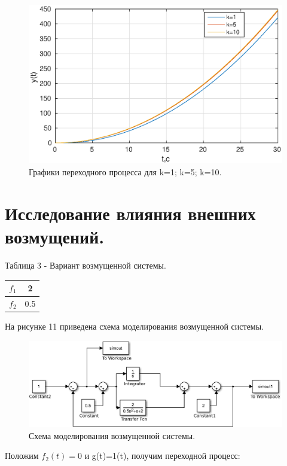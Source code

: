 \documentclass[a4paper,14pt]{article}
\begin{document}
\begin{figure}[H]
\centering
\includegraphics[width=\textwidth]{1/2_3y(t).eps}
\caption{Графики переходного процесса для k=1; k=5; k=10.}
\end{figure}

\newpage
\section{Исследование влияния внешних возмущений.}
Таблица 3 - Вариант возмущенной системы.

\begin{center}
\begin{tabular}{ |c|c| } 
 \hline
 $f_{1}$ & 2 \\ 
 \hline
 $f_{2}$ & 0.5 \\ 
 \hline
\end{tabular}
\end{center}
На рисунке 11 приведена схема моделирования возмущенной системы.

\begin{figure}[H]
\centering
\includegraphics[width=\textwidth]{1/3.eps}
\caption{Схема моделирования возмущенной системы.}
\end{figure}


Положим $f_{2}(t)=0$ и g(t)=1(t), получим переходной процесс:
\end{document}
